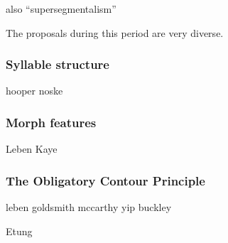 
also ``supersegmentalism''

The proposals during this period are very diverse. 

\subsubsection{Syllable structure}

hooper
noske

\subsubsection{Morph features}

Leben
Kaye


\subsubsection{The Obligatory Contour Principle}

leben
goldsmith
mccarthy
yip
buckley

Etung 
\citet{Goldsmith1976}

\citet{Edmondson1966}









\citet{McCarthy1979}
\citet{Yip1988b}

